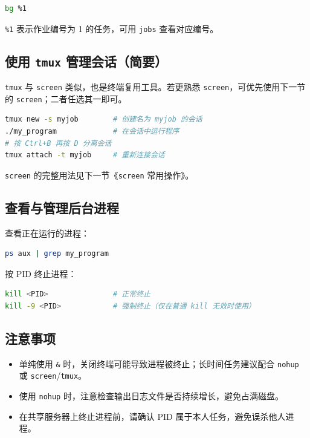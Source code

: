 \begin{lstlisting}[language=sh]
bg %1
\end{lstlisting}

\texttt{\%1} 表示作业编号为 1 的任务，可用 \texttt{jobs} 查看对应编号。

\subsection{使用 \texttt{tmux} 管理会话（简要）}

\texttt{tmux} 与 \texttt{screen} 类似，也是终端复用工具。若更熟悉 \texttt{screen}，可优先使用下一节的 \texttt{screen}；二者任选其一即可。

\begin{lstlisting}[language=sh]
tmux new -s myjob        # 创建名为 myjob 的会话
./my_program             # 在会话中运行程序
# 按 Ctrl+B 再按 D 分离会话
tmux attach -t myjob     # 重新连接会话
\end{lstlisting}

\texttt{screen} 的完整用法见下一节《\texttt{screen} 常用操作》。

\subsection{查看与管理后台进程}

查看正在运行的进程：

\begin{lstlisting}[language=sh]
ps aux | grep my_program
\end{lstlisting}

按 PID 终止进程：

\begin{lstlisting}[language=sh]
kill <PID>               # 正常终止
kill -9 <PID>            # 强制终止（仅在普通 kill 无效时使用）
\end{lstlisting}

\subsection{注意事项}

\begin{itemize}
    \item 单纯使用 \texttt{\&} 时，关闭终端可能导致进程被终止；长时间任务建议配合 \texttt{nohup} 或 \texttt{screen}/\texttt{tmux}。
    \item 使用 \texttt{nohup} 时，注意检查输出日志文件是否持续增长，避免占满磁盘。
    \item 在共享服务器上终止进程前，请确认 PID 属于本人任务，避免误杀他人进程。
\end{itemize}

